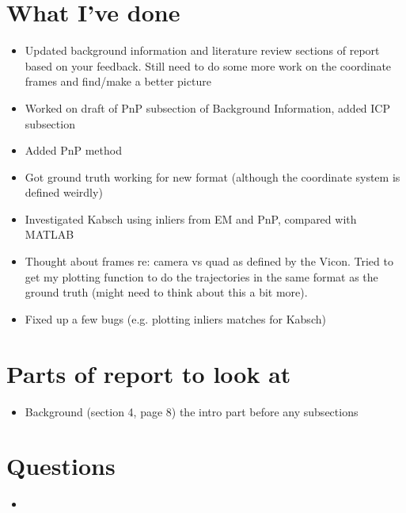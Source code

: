 \documentclass[12pt,a4paper]{article}
\begin{document}
\author{Katrina Ashton}


\pagestyle{fancy}
\fancyhf{}
\rhead{\thepage}

\section{What I've done}
\begin{itemize}
  \item Updated background information and literature review sections of report based on your feedback. Still need to do some more work on the coordinate frames and find/make a better picture
  \item Worked on draft of PnP subsection of Background Information, added ICP subsection 
  \item Added PnP method
  \item Got ground truth working for new format (although the coordinate system is defined weirdly)
  \item Investigated Kabsch using inliers from EM and PnP, compared with MATLAB
  \item Thought about frames re: camera vs quad as defined by the Vicon. Tried to get my plotting function to do the trajectories in the same format as the ground truth (might need to think about this a bit more).
  \item Fixed up a few bugs (e.g. plotting inliers matches for Kabsch)
\end{itemize}

\section{Parts of report to look at}
\begin{itemize}
\item Background (section 4, page 8) the intro part before any subsections 
\end{itemize}

\section{Questions}
\begin{itemize}
\item 
\end{itemize}
\end{document}
